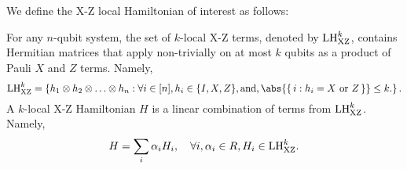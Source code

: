 

We define the X-Z local Hamiltonian of interest as follows: 

\begin{dfn} For any $n$-qubit system, the set of $k$-local X-Z terms, denoted by $\mathrm{LH}_{\mathrm{XZ}}^{k}$, contains Hermitian matrices that apply non-trivially on at most $k$ qubits as a product of Pauli $X$ and $Z$ terms. Namely, 
\begin{equation}
  \LHXZ{k} = \left\{h_1 \otimes h_2 \otimes \ldots \otimes h_n: \forall i \in [n], h_i \in \{I, X, Z\}, \text{and}, \abs{\set{i: h_i=X \text{ or }Z}} \leq k. \right \}. 
\end{equation}
A $k$-local X-Z Hamiltonian $H$ is a linear combination of terms from $\mathrm{LH}_{\mathrm{XZ}}^{k}$. Namely, 
\begin{equation}
  H = \sum_i \alpha_{i} H_i,  \quad \forall i, \alpha_i \in R,  H_i \in \mathrm{LH}_{\mathrm{XZ}}^{k}.
\end{equation}
\end{dfn}

